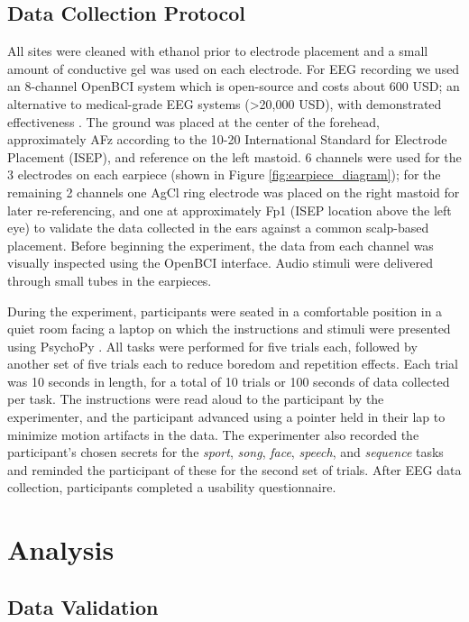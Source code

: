 \documentclass{sigchi}
\begin{document}
\subsection{Data Collection Protocol}
All sites were cleaned with ethanol prior to electrode placement and a small amount of conductive gel was used on each electrode. For EEG recording we used an 8-channel OpenBCI system \cite{michalska2009openbci} which is open-source and costs about 600 USD; an alternative to medical-grade EEG systems (\textgreater20,000 USD), with demonstrated effectiveness \cite{Frey2016}. The ground was placed at the center of the forehead, approximately AFz according to the 10-20 International Standard for Electrode Placement (ISEP), and reference on the left mastoid. 6 channels were used for the 3 electrodes on each earpiece (shown in Figure \ref{fig:earpiece_diagram}); for the remaining 2 channels one AgCl ring electrode was placed on the right mastoid for later re-referencing, and one at approximately Fp1 (ISEP location above the left eye) to validate the data collected in the ears against a common scalp-based placement. Before beginning the experiment, the data from each channel was visually inspected using the OpenBCI interface. Audio stimuli were delivered through small tubes in the earpieces.

During the experiment, participants were seated in a comfortable position in a quiet room facing a laptop on which the instructions and stimuli were presented using PsychoPy \cite{peirce2007psychopy}. All tasks were performed for five trials each, followed by another set of five trials each to reduce boredom and repetition effects. Each trial was 10 seconds in length, for a total of 10 trials or 100 seconds of data collected per task. The instructions were read aloud to the participant by the experimenter, and the participant advanced using a pointer held in their lap to minimize motion artifacts in the data. The experimenter also recorded the participant's chosen secrets for the \textit{sport}, \textit{song}, \textit{face}, \textit{speech}, and \textit{sequence} tasks and reminded the participant of these for the second set of trials. After EEG data collection, participants completed a usability questionnaire.

\section{Analysis}
\subsection{Data Validation}
\end{document}
